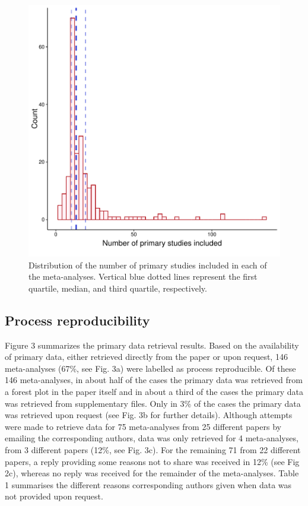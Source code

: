 \documentclass[
  ,apa7,floatsintext]{apa6}
\begin{document}
\begin{figure}
\centering
\includegraphics{manuscript_files/figure-latex/unnamed-chunk-1-1.pdf}
\caption{\label{fig:unnamed-chunk-1}Distribution of the number of primary studies included in each of the meta-analyses. Vertical blue dotted lines represent the first quartile, median, and third quartile, respectively.}
\end{figure}

\hypertarget{process-reproducibility}{%
\subsection{Process reproducibility}\label{process-reproducibility}}

Figure 3 summarizes the primary data retrieval results. Based on the availability of primary data, either retrieved directly from the paper or upon request, 146 meta-analyses (67\%, see Fig. 3a) were labelled as process reproducible. Of these 146 meta-analyses, in about half of the cases the primary data was retrieved from a forest plot in the paper itself and in about a third of the cases the primary data was retrieved from supplementary files. Only in 3\% of the cases the primary data was retrieved upon request (see Fig. 3b for further details). Although attempts were made to retrieve data for 75 meta-analyses from 25 different papers by emailing the corresponding authors, data was only retrieved for 4 meta-analyses, from 3 different papers (12\%, see Fig. 3c). For the remaining 71 from 22 different papers, a reply providing some reasons not to share was received in 12\% (see Fig 2c), whereas no reply was received for the remainder of the meta-analyses. Table 1 summarises the different reasons corresponding authors given when data was not provided upon request.
\end{document}
